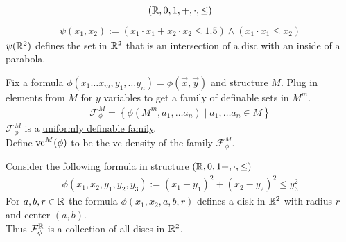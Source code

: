 \documentclass{beamer}
\newcommand{\F}{\mathcal F}
\newcommand{\curly}[1]{\left\{ #1 \right\}}
\newcommand{\defn}{\underline}
\begin{document}
\begin{frame}
  \begin{align*}
    (\mathbb{R}, 0, 1, +, \cdot, \leq)
  \end{align*}
  \begin{align*}
    \psi(x_1, x_2) := (x_1 \cdot x_1 + x_2 \cdot x_2 \leq 1.5) \wedge (x_1\cdot x_1 \leq x_2)
  \end{align*}
  $\psi(\mathbb{R}^2)$ defines the set in $\mathbb{R}^2$ that is an intersection of a disc with an inside of a parabola.
\end{frame}

\begin{frame}
  \begin{Definition}
    Fix a formula $\phi(x_1 \ldots x_m, y_1, \ldots y_n) = \phi(\vec x, \vec y)$ and structure $M$.
    Plug in elements from $M$ for $y$ variables to get a family of definable sets in $M^m$.
    \begin{align*}
      \F^M_\phi = \curly{\phi(M^m, a_1, \ldots a_n) \mid a_1, \ldots a_n \in M}
    \end{align*}
    $\F^M_\phi$ is a \defn{uniformly definable family}. \\
    Define $\operatorname{vc}^M(\phi)$ to be the vc-density of the family $\F^M_\phi$.
  \end{Definition}
\end{frame}

\begin{frame}
  \begin{Example}
    Consider the following formula in structure $(\mathbb{R}, 0, 1 +, \cdot, \leq)$
    \begin{align*}
      \phi(x_1, x_2, y_1, y_2, y_3) := (x_1 - y_1)^2 + (x_2 - y_2)^2 \leq y_3^2
    \end{align*}
    For $a,b,r \in \mathbb{R}$ the formula $\phi(x_1, x_2, a, b, r)$ defines a disk in $\mathbb{R}^2$ with radius $r$ and center $(a,b)$. \\
    Thus $\F^\R_\phi$ is a collection of all discs in $\mathbb{R}^2$.
  \end{Example}
\end{frame}
\end{document}
